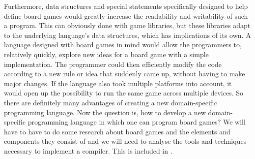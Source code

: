 Furthermore, data structures and special statements specifically
designed to help define board games would greatly increase the
readability and writability of such a program. This can obviously
done with game libraries, but these libraries adapt to the underlying
language's data structures, which has implications of its own. A
language designed with board games in mind would allow the programmers
to, relatively quickly, explore new ideas for a board game with a simple
implementation. The programmer could then efficiently modify the code
according to a new rule or idea that suddenly came up, without having
to make major changes. If the language also took multiple platforms
into account, it would open up the possibility to run the same game
across multiple devices. So there are definitely many advantages of
creating a new domain-specific programming language. Now the question
is, how to develop a new domain-specific programming language in which
one can program board games? We will have to have to do some research
about board games and the elements and components they consist of and we
will need to analyse the tools and techniques necessary to implement a
compiler. This is included in .
